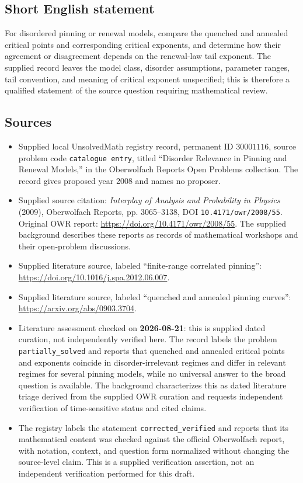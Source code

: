 \documentclass[11pt]{article}
\begin{document}
\subsection{Short English statement}
For disordered pinning or renewal models, compare the quenched and annealed critical points and corresponding critical exponents, and determine how their agreement or disagreement depends on the renewal-law tail exponent. The supplied record leaves the model class, disorder assumptions, parameter ranges, tail convention, and meaning of critical exponent unspecified; this is therefore a qualified statement of the source question requiring mathematical review.
\subsection{Sources}
\begin{itemize}
\item Supplied local UnsolvedMath registry record, permanent ID \(30001116\), source problem code \texttt{catalogue entry}, titled ``Disorder Relevance in Pinning and Renewal Models,'' in the Oberwolfach Reports Open Problems collection. The record gives proposed year 2008 and names no proposer.
\item Supplied source citation: \emph{Interplay of Analysis and Probability in Physics} (2009), Oberwolfach Reports, pp. 3065--3138, DOI \texttt{10.4171/owr/2008/55}. Original OWR report: \url{https://doi.org/10.4171/owr/2008/55}. The supplied background describes these reports as records of mathematical workshops and their open-problem discussions.
\item Supplied literature source, labeled ``finite-range correlated pinning'': \url{https://doi.org/10.1016/j.spa.2012.06.007}.
\item Supplied literature source, labeled ``quenched and annealed pinning curves'': \url{https://arxiv.org/abs/0903.3704}.
\item Literature assessment checked on \textbf{2026-08-21}: this is supplied dated curation, not independently verified here. The record labels the problem \texttt{partially\_solved} and reports that quenched and annealed critical points and exponents coincide in disorder-irrelevant regimes and differ in relevant regimes for several pinning models, while no universal answer to the broad question is available. The background characterizes this as dated literature triage derived from the supplied OWR curation and requests independent verification of time-sensitive status and cited claims.
\item The registry labels the statement \texttt{corrected\_verified} and reports that its mathematical content was checked against the official Oberwolfach report, with notation, context, and question form normalized without changing the source-level claim. This is a supplied verification assertion, not an independent verification performed for this draft.
\end{itemize}
\end{document}
